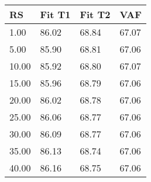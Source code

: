 \begin{tabular}{llll}
RS & Fit T1 & Fit T2 & VAF \\ 
\hline 
 1.00 & 86.02 & 68.84 & 67.07 \\ 
 5.00 & 85.90 & 68.81 & 67.06 \\ 
10.00 & 85.92 & 68.80 & 67.07 \\ 
15.00 & 85.96 & 68.79 & 67.06 \\ 
20.00 & 86.02 & 68.78 & 67.06 \\ 
25.00 & 86.06 & 68.77 & 67.06 \\ 
30.00 & 86.09 & 68.77 & 67.06 \\ 
35.00 & 86.13 & 68.74 & 67.06 \\ 
40.00 & 86.16 & 68.75 & 67.06 \\ 
\hline 
\end{tabular}